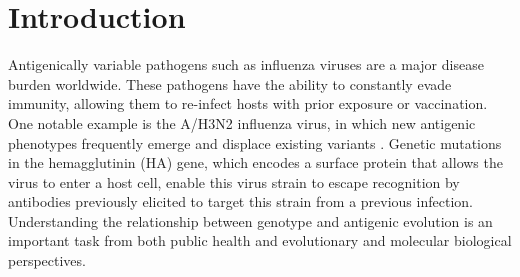 \documentclass[11pt,oneside,letterpaper]{article}
\begin{document}
\begin{abstract}

\end{abstract}


\pagebreak

\section*{Introduction}

Antigenically variable pathogens such as influenza viruses are a major disease burden worldwide. 
These pathogens have the ability to constantly evade immunity, allowing them to re-infect hosts with prior exposure or vaccination. 
One notable example is the A/H3N2 influenza virus, in which new antigenic phenotypes frequently emerge and displace existing variants \cite{smith_mapping_2004, bedford_integrating_2014}.
Genetic mutations in the hemagglutinin (HA) gene, which encodes a surface protein that allows the virus to enter a host cell, enable this virus strain to escape recognition by antibodies previously elicited to target this strain from a previous infection. 
Understanding the relationship between genotype and antigenic evolution is an important task from both public health and evolutionary and molecular biological perspectives.
\end{document}
